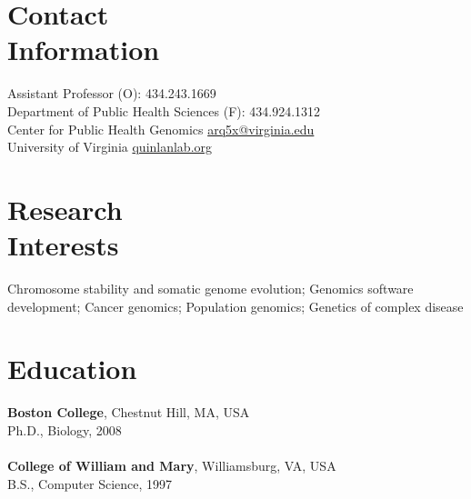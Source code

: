 \documentclass[margin,line]{cv}
\begin{document}
\begin{resume}
    \section{\mysidestyle Contact\\Information}
    Assistant Professor                                                                     \hfill (O): 434.243.1669\\%
    Department of Public Health Sciences                                                    \hfill (F): 434.924.1312\\%
    Center for Public Health Genomics                                                \hfill \url{arq5x@virginia.edu}\\%
    University of Virginia                                                    \hfill \url{quinlanlab.org}\\%

    \section{\mysidestyle Research\\Interests}

    Chromosome stability and somatic genome evolution; Genomics software development; Cancer genomics;
    Population genomics; Genetics of complex disease 

    \section{\mysidestyle Education}

    \textbf{Boston College}, Chestnut Hill, MA, USA\\
    Ph.D., Biology, 2008\\
    \\
    \textbf{College of William and Mary}, Williamsburg, VA, USA\\
    B.S., Computer Science, 1997



\end{resume}
\end{document}
